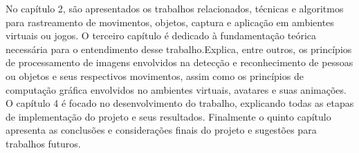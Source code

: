 No capítulo 2, são apresentados os trabalhos relacionados, técnicas e algoritmos para rastreamento de movimentos,
objetos, captura e aplicação em ambientes virtuais ou jogos.
O terceiro capítulo é dedicado à fundamentação teórica necessária para o entendimento
desse trabalho.Explica, entre outros, os princípios de processamento de imagens
envolvidos na detecção e reconhecimento de pessoas ou objetos e seus respectivos movimentos,
assim como os princípios de computação gráfica envolvidos no ambientes virtuais,
avatares e suas animações.
O capítulo 4 é focado no desenvolvimento do trabalho, explicando todas as etapas de
implementação do projeto e seus resultados.
Finalmente o quinto capítulo apresenta as conclusões e considerações finais do projeto e sugestões
para trabalhos futuros.

